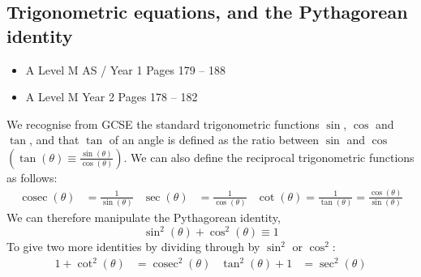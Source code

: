 \documentclass[11pt, a4paper]{article}
\DeclareMathOperator{\cosec}{cosec}
\begin{document}
\subsection{Trigonometric equations, and the Pythagorean identity}
\begin{itemize}
\item A Level M AS / Year 1 \hspace{1cm} \phantom{ } Pages 179 -- 188
\item A Level M Year 2 \hspace{1cm} \phantom{ AS / } Pages 178 -- 182
\end{itemize} \par
We recognise from GCSE the standard trigonometric functions $\sin$, $\cos$ and $\tan$, and that $\tan$ of an angle is defined as the ratio between $\sin$ and $\cos$ $\left(\tan(\theta)\equiv\frac{\sin(\theta)}{\cos(\theta)}\right)$. We can also define the reciprocal trigonometric functions as follows:
\small
\begin{align*}
\cosec(\theta)&=\frac{1}{\sin(\theta)} & \sec(\theta)&=\frac{1}{\cos(\theta)} & \cot(\theta)=\frac{1}{\tan(\theta)}=\frac{\cos(\theta)}{\sin(\theta)}
\end{align*}
\normalsize
We can therefore manipulate the Pythagorean identity,
\begin{equation*}
\sin^{2}(\theta)+\cos^{2}(\theta)\equiv1
\end{equation*}
To give two more identities by dividing through by $\sin^{2}$ or $\cos^{2}$:
\begin{align*}
1+\cot^{2}(\theta)&=\cosec^{2}(\theta) & \tan^{2}(\theta)+1&=\sec^{2}(\theta)
\end{align*}
\normalsize

\vspace{0.5cm}
\end{document}
